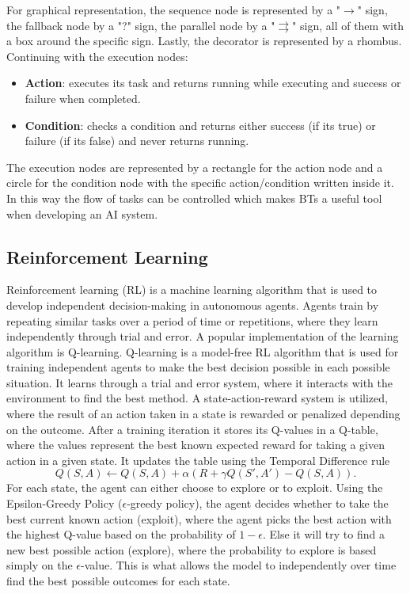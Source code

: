 For graphical representation, the sequence node is represented by a "$\rightarrow$" sign, the fallback node by a "?" sign, the parallel node by a "$\rightrightarrows$" sign, all of them with a box around the specific sign. Lastly, the decorator is represented by a rhombus.
Continuing with the execution nodes:
\begin{itemize}
    \item \textbf{Action}: executes its task and returns running while executing and success or failure when completed.
    \item \textbf{Condition}: checks a condition and returns either success (if its true) or failure (if its false) and never returns running. 
\end{itemize} 
The execution nodes are represented by a rectangle for the action node and a circle for the condition node with the specific action/condition written inside it.
In this way the flow of tasks can be controlled which makes BTs a useful tool when developing an AI system\cite{BTsinAI}. 

\subsection{Reinforcement Learning}
Reinforcement learning (RL) is a machine learning
algorithm that is used to develop independent decision-making in autonomous agents.
Agents train by repeating similar tasks over a period of time or repetitions, where they
learn independently through trial and error. A popular implementation of the learning
algorithm is Q-learning\cite{JacobMurel1RL}. Q-learning is a model-free RL
algorithm that is used for training independent agents to make the best decision
possible in each possible situation. It learns through a trial and error system, where it
interacts with the environment to find the best method. A state-action-reward system is
utilized, where the result of an action taken in a state is rewarded or penalized
depending on the outcome. After a training iteration it stores its Q-values in a Q-table,
where the values represent the best known expected reward for taking a given action in
a given state. It updates the table using the Temporal Difference rule
\[
Q(S, A) \leftarrow Q(S, A) + \alpha \left( R + \gamma Q(S', A') - Q(S, A) \right).
\]
For each state, the agent can either choose to
explore or to exploit. Using the Epsilon-Greedy Policy (\(\epsilon\)-greedy policy), the agent
decides whether to take the best current known action (exploit), where the agent picks
the best action with the highest Q-value based on the probability of \(1-\epsilon\). Else it will try to
find a new best possible action (explore), where the probability to explore is based
simply on the \(\epsilon\)-value. This is what allows the model to independently over time find the
best possible outcomes for each state\cite{GeeksForGeeks1RL}.

